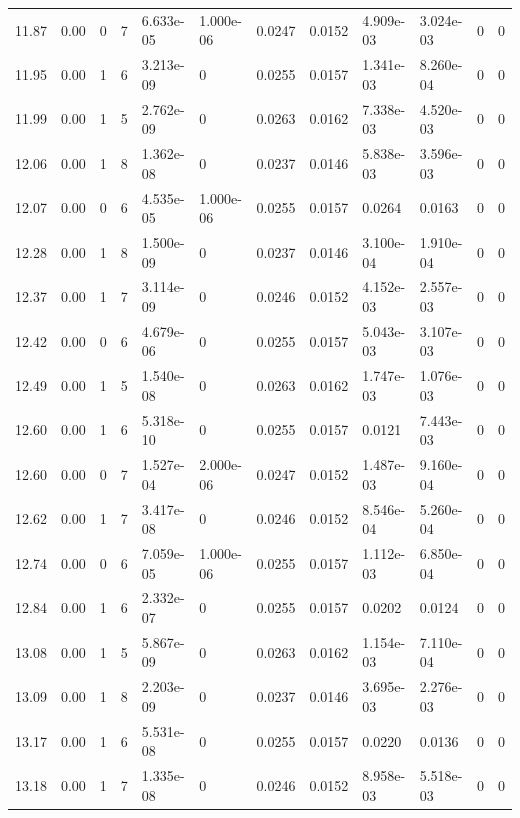 \documentclass[preview]{standalone}
\begin{document}
{{{{{\begin{tabular}{L{1.2cm}C{1.2cm} C{0.3cm}C{0.5cm} C{1.4cm}C{1.4cm} C{1.4cm}C{1.4cm} C{1.6cm}C{1.6cm} C{1.6cm}C{1.6cm}}
  11.87  &  0.00  & 0     &  7 &  6.633e-05  & 1.000e-06  &  0.0247&   0.0152& 4.909e-03 & 3.024e-03   &  0 & 0  \\ 
  11.95  &  0.00  & 1     &  6 &  3.213e-09  & 0  &  0.0255&   0.0157& 1.341e-03 & 8.260e-04   &  0 & 0  \\ 
  11.99  &  0.00  & 1     &  5 &  2.762e-09  & 0  &  0.0263&   0.0162& 7.338e-03 & 4.520e-03   &  0 & 0  \\ 
  12.06  &  0.00  & 1     &  8 &  1.362e-08  & 0  &  0.0237&   0.0146& 5.838e-03 & 3.596e-03   &  0 & 0  \\ 
  12.07  &  0.00  & 0     &  6 &  4.535e-05  & 1.000e-06  &  0.0255&   0.0157& 0.0264 & 0.0163   &  0 & 0  \\ 
  12.28  &  0.00  & 1     &  8 &  1.500e-09  & 0  &  0.0237&   0.0146& 3.100e-04 & 1.910e-04   &  0 & 0  \\ 
  12.37  &  0.00  & 1     &  7 &  3.114e-09  & 0  &  0.0246&   0.0152& 4.152e-03 & 2.557e-03   &  0 & 0  \\ 
  12.42  &  0.00  & 0     &  6 &  4.679e-06  & 0  &  0.0255&   0.0157& 5.043e-03 & 3.107e-03   &  0 & 0  \\ 
  12.49  &  0.00  & 1     &  5 &  1.540e-08  & 0  &  0.0263&   0.0162& 1.747e-03 & 1.076e-03   &  0 & 0  \\ 
  12.60  &  0.00  & 1     &  6 &  5.318e-10  & 0  &  0.0255&   0.0157& 0.0121 & 7.443e-03   &  0 & 0  \\ 
  12.60  &  0.00  & 0     &  7 &  1.527e-04  & 2.000e-06  &  0.0247&   0.0152& 1.487e-03 & 9.160e-04   &  0 & 0  \\ 
  12.62  &  0.00  & 1     &  7 &  3.417e-08  & 0  &  0.0246&   0.0152& 8.546e-04 & 5.260e-04   &  0 & 0  \\ 
  12.74  &  0.00  & 0     &  6 &  7.059e-05  & 1.000e-06  &  0.0255&   0.0157& 1.112e-03 & 6.850e-04   &  0 & 0  \\ 
  12.84  &  0.00  & 1     &  6 &  2.332e-07  & 0  &  0.0255&   0.0157& 0.0202 & 0.0124   &  0 & 0  \\ 
  13.08  &  0.00  & 1     &  5 &  5.867e-09  & 0  &  0.0263&   0.0162& 1.154e-03 & 7.110e-04   &  0 & 0  \\ 
  13.09  &  0.00  & 1     &  8 &  2.203e-09  & 0  &  0.0237&   0.0146& 3.695e-03 & 2.276e-03   &  0 & 0  \\ 
  13.17  &  0.00  & 1     &  6 &  5.531e-08  & 0  &  0.0255&   0.0157& 0.0220 & 0.0136   &  0 & 0  \\ 
  13.18  &  0.00  & 1     &  7 &  1.335e-08  & 0  &  0.0246&   0.0152& 8.958e-03 & 5.518e-03   &  0 & 0  \\ 

\end{tabular}}}}}}
\end{document}
